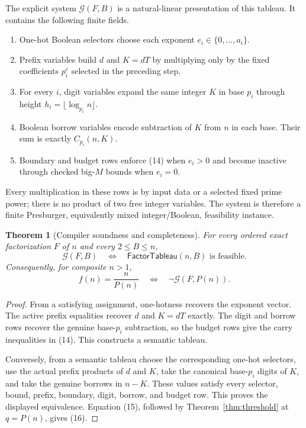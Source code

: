 \documentclass[11pt]{article}
\newtheorem{theorem}{Theorem}
\theoremstyle{remark}
\newcommand{\FactorTableau}{\mathsf{FactorTableau}}
\newcommand{\GSys}{\mathcal G}
\begin{document}
The explicit system $\GSys(F,B)$ is a natural-linear presentation of this
tableau.  It contains the following finite fields.
\begin{enumerate}
\item One-hot Boolean selectors choose each exponent
      $e_i\in\{0,\ldots,a_i\}$.
\item Prefix variables build $d$ and $K=dT$ by multiplying only by the fixed
      coefficients $p_i^e$ selected in the preceding step.
\item For every $i$, digit variables expand the same integer $K$ in base
      $p_i$ through height $h_i=\lfloor\log_{p_i}n\rfloor$.
\item Boolean borrow variables encode subtraction of $K$ from $n$ in each
      base.  Their sum is exactly $C_{p_i}(n,K)$.
\item Boundary and budget rows enforce (14) when $e_i>0$ and become inactive
      through checked big-$M$ bounds when $e_i=0$.
\end{enumerate}
Every multiplication in these rows is by input data or a selected fixed
prime power; there is no product of two free integer variables.  The system
is therefore a finite Presburger, equivalently mixed integer/Boolean,
feasibility instance.

\begin{theorem}[Compiler soundness and completeness]\label{thm:compiler}
For every ordered exact factorization $F$ of $n$ and every
$2\leq B\leq n$,
\[
 \boxed{
 \GSys(F,B)
 \quad\Longleftrightarrow\quad
 \FactorTableau(n,B)\text{ is feasible}.}
\]
Consequently, for composite $n>1$,
\[
 \boxed{
 f(n)=\frac{n}{P(n)}
 \quad\Longleftrightarrow\quad
 \neg\GSys(F,P(n)).}                                    \tag{16}
\]
\end{theorem}

\begin{proof}
From a satisfying assignment, one-hotness recovers the exponent vector.
The active prefix equalities recover $d$ and $K=dT$ exactly.  The digit and
borrow rows recover the genuine base-$p_i$ subtraction, so the budget rows
give the carry inequalities in (14).  This constructs a semantic tableau.

Conversely, from a semantic tableau choose the corresponding one-hot
selectors, use the actual prefix products of $d$ and $K$, take the canonical
base-$p_i$ digits of $K$, and take the genuine borrows in $n-K$.  These values
satisfy every selector, bound, prefix, boundary, digit, borrow, and budget
row.  This proves the displayed equivalence.  Equation (15), followed by
Theorem~\ref{thm:threshold} at $q=P(n)$, gives (16).
\end{proof}
\end{document}
